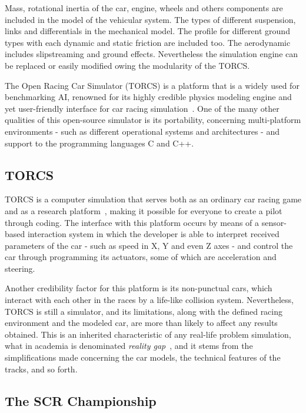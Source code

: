 	Mass, rotational inertia of the car, engine, wheels and others components are included in the model of the vehicular system. The types of different suspension, links and differentials in the mechanical model. The profile for different ground types with each dynamic and static friction are included too. The aerodynamic includes slipstreaming and ground effects. Nevertheless the simulation engine can be replaced or easily modified owing the modularity of the TORCS.



	The Open Racing Car Simulator (TORCS) is a platform that is a widely used for benchmarking AI, renowned for its highly credible physics modeling engine and yet user-friendly interface for car racing simulation~\cite{TORCS}. One of the	many other qualities of this open-source simulator is its portability, concerning multi-platform environments - such as different operational systems and architectures - and support to the programming languages C and C++.

\subsection{TORCS} \label{subsec:TORCS}
	
	TORCS is a computer simulation that serves both as an ordinary car racing game and as a research platform~\cite{2009}, making it possible for everyone to create a pilot through coding. The interface with this platform occurs by means of a sensor-based interaction system in which the developer is able to interpret received parameters of the car - such as speed in X, Y and even Z axes - and control the car through programming its actuators, some of which are acceleration and steering.
	
	Another credibility factor for this platform is its non-punctual cars, which interact with each other in the races by a life-like collision system. Nevertheless, TORCS is still a simulator, and its limitations, along with the defined racing environment and the modeled car, are more than likely to affect any results obtained. This is an inherited characteristic of any real-life problem simulation, what in academia is denominated \emph{reality gap}~\cite{RG}, and it stems from the simplifications made concerning the car models, the technical features of the tracks, and so forth.

\subsection{The SCR Championship} \label{subsec:SCRC}


